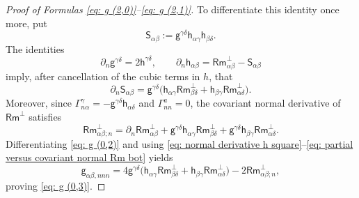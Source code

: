 \documentclass[11pt]{amsart}
\theoremstyle{definition}
\numberwithin{equation}{section}
\begin{document}
\begin{proof}[Proof of Formulas \eqref{eq: g (2,0)}--\eqref{eq: g (2,1)}]
    To differentiate this identity once more, put
    \[
        \mathsf S_{\alpha\beta}:=\mathsf g^{\gamma\delta}\mathsf h_{\alpha\gamma}\mathsf h_{\beta\delta}.
    \]
    The identities
    \[
        \partial_n \mathsf g^{\gamma\delta}=2\mathsf h^{\gamma\delta},
        \qquad
        \partial_n \mathsf h_{\alpha\beta}=\mathsf{Rm}^\bot_{\alpha\beta}-\mathsf S_{\alpha\beta}
    \]
    imply, after cancellation of the cubic terms in $h$, that
    \begin{equation}\label{eq: normal derivative h square}
        \partial_n \mathsf S_{\alpha\beta}
        =\mathsf g^{\gamma\delta}\bigl(
        \mathsf h_{\alpha\gamma}\mathsf {Rm}^\bot_{\beta\delta}
        +\mathsf h_{\beta\gamma}\mathsf{Rm}^\bot_{\alpha\delta}\bigr).
    \end{equation}
    Moreover, since $\mathsf \Gamma_{n\alpha}^{\gamma}=-\mathsf g^{\gamma\delta}\mathsf h_{\alpha\delta}$ and $\mathsf \Gamma_{nn}^{a}=0$, the covariant normal derivative of $\mathsf {Rm}^\bot$ satisfies
    \begin{equation}\label{eq: partial versus covariant normal Rm bot}
        \mathsf {Rm}^\bot_{\alpha\beta;n}
        =\partial_n\mathsf{Rm}^\bot_{\alpha\beta}
        +\mathsf g^{\gamma\delta}\mathsf h_{\alpha\gamma}\mathsf {Rm}^\bot_{\beta\delta}
        +\mathsf g^{\gamma\delta}\mathsf h_{\beta\gamma}\mathsf{Rm}^\bot_{\alpha\delta}.
    \end{equation}
    Differentiating \eqref{eq: g (0,2)} and using
    \eqref{eq: normal derivative h square}--\eqref{eq: partial versus covariant normal Rm bot} yields
    \[
        \mathsf g_{\alpha\beta,nnn}
        =4\mathsf g^{\gamma\delta}\bigl(
        \mathsf h_{\alpha\gamma}\mathsf {Rm}^\bot_{\beta\delta}
        +\mathsf h_{\beta\gamma}\mathsf {Rm}^\bot_{\alpha\delta}\bigr)
        -2\mathsf {Rm}^\bot_{\alpha\beta;n},
    \]
    proving \eqref{eq: g (0,3)}.


\end{proof}
\end{document}
